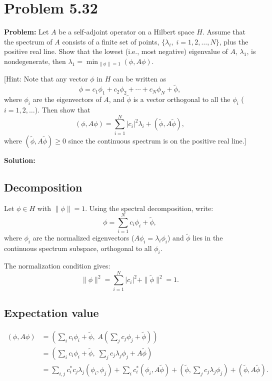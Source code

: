 \documentclass[12pt]{article}
\begin{document}
\section*{Problem 5.32}

\textbf{Problem:} Let $A$ be a self-adjoint operator on a Hilbert space $H$. Assume that the spectrum of $A$ consists of a finite set of points, $\{\lambda_i,\; i = 1, 2, \ldots, N\}$, plus the positive real line. Show that the lowest (i.e., most negative) eigenvalue of $A$, $\lambda_1$, is nondegenerate, then $\lambda_1 = \min_{\|\phi\|=1}(\phi, A\phi)$.

[Hint: Note that any vector $\phi$ in $H$ can be written as
\[
\phi = c_1\phi_1 + c_2\phi_2 + \cdots + c_N\phi_N + \tilde{\phi},
\]
where $\phi_i$ are the eigenvectors of $A$, and $\tilde{\phi}$ is a vector orthogonal to all the $\phi_i$ ($i = 1, 2, \ldots$). Then show that
\[
(\phi, A\phi) = \sum_{i=1}^{N}|c_i|^2\lambda_i + (\tilde{\phi}, A\tilde{\phi}),
\]
where $(\tilde{\phi}, A\tilde{\phi}) \geq 0$ since the continuous spectrum is on the positive real line.]

\bigskip
\textbf{Solution:}

\subsection*{Decomposition}

Let $\phi \in H$ with $\|\phi\| = 1$. Using the spectral decomposition, write:
\[
\phi = \sum_{i=1}^{N}c_i\phi_i + \tilde{\phi},
\]
where $\phi_i$ are the normalized eigenvectors ($A\phi_i = \lambda_i\phi_i$) and $\tilde{\phi}$ lies in the continuous spectrum subspace, orthogonal to all $\phi_i$.

The normalization condition gives:
\[
\|\phi\|^2 = \sum_{i=1}^{N}|c_i|^2 + \|\tilde{\phi}\|^2 = 1. \tag{$*$}
\]

\subsection*{Expectation value}

\begin{align}
(\phi, A\phi) &= \left(\sum_i c_i\phi_i + \tilde{\phi},\; A\left(\sum_j c_j\phi_j + \tilde{\phi}\right)\right) \\
&= \left(\sum_i c_i\phi_i + \tilde{\phi},\; \sum_j c_j\lambda_j\phi_j + A\tilde{\phi}\right) \\
&= \sum_{i,j}c_i^*c_j\lambda_j(\phi_i,\phi_j) + \sum_i c_i^*(\phi_i, A\tilde{\phi}) + (\tilde{\phi}, \sum_j c_j\lambda_j\phi_j) + (\tilde{\phi}, A\tilde{\phi}).
\end{align}
\end{document}

